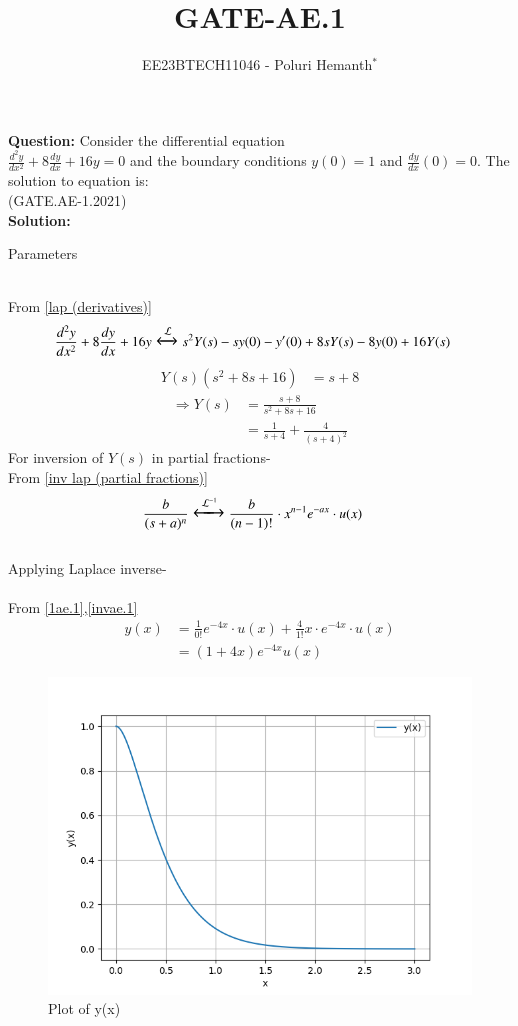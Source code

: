 \documentclass[journal,12pt,twocolumn]{IEEEtran}
\theoremstyle{remark}
\begin{document}

\vspace{3cm}

\title{GATE-AE.1}
\author{EE23BTECH11046 - Poluri Hemanth$^{*}$}
\maketitle
\textbf{Question:}
Consider the differential equation \\$\frac{d^2y}{dx^2}+8\frac{dy}{dx}+16y=0$ and the boundary conditions $y(0)=1$ and $\frac{dy}{dx}(0)=0$. The solution to equation is:\\
\hfill{(GATE.AE-1.2021)}\\
\textbf{Solution:}\\
\fi
\begin{table}[h!]
        
        \caption{Parameters}
\end{table}\\
From \ref{lap (derivatives)}
\begin{align}
	\frac{d^2y}{dx^2}+8\frac{dy}{dx}+16y&\Large\xleftrightarrow{\mathcal{L}}s^2Y(s)-sy(0)-y'(0)+8sY(s)-8y(0)+16Y(s)
\end{align}
\begin{align}
	Y(s)(s^2+8s+16)&=s+8
\end{align}
\begin{align}
	\Rightarrow Y(s)&=\frac{s+8}{s^2+8s+16}\\
	&=\frac{1}{s+4}+\frac{4}{(s+4)^2}\label{1ae.1}
\end{align}
For inversion of $Y(s)$ in partial fractions-
\\ From \ref{inv lap (partial fractions)}
\begin{align}
	&\frac{b}{(s+a)^n}\Large\xleftrightarrow{\mathcal{L}^{-1}}\frac{b}{(n-1)!}\cdot x^{n-1} e^{-ax}\cdot u(x)\label{invae.1}
\end{align}
\\
Applying Laplace inverse-\\
\\From \eqref{1ae.1},\eqref{invae.1}
\begin{align}
	y(x)&=\frac{1}{0!} e^{-4x}\cdot u(x)+\frac{4}{1!}x\cdot e^{-4x}\cdot u(x)\\
	&=(1+4x)e^{-4x}u(x)
\end{align}
\newpage
\begin{figure}[h!]
    \centering
    \includegraphics[width=1\linewidth]{2021/AE/1/figures/figure.png}
        \caption{Plot of y(x)}
\end{figure}


\end{document}
